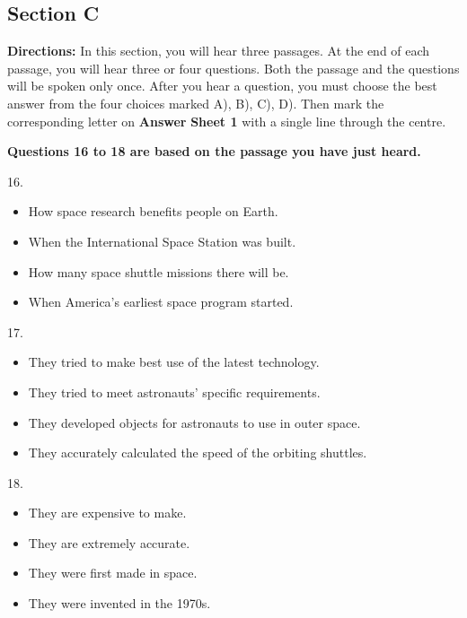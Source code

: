 \documentclass[UTF8,11pt]{ctexart}
\begin{document}
\subsection*{\textbf{Section C}}


\textbf{Directions:} In this section, you will hear three passages. At the end of each passage, you will hear three or four questions. Both the passage and the questions will be spoken only once. After you hear a question, you must choose the best answer from the four choices marked A), B), C), D). Then mark the corresponding letter on\textbf{ Answer} \textbf{Sheet 1} with a single line through the centre.


\textbf{Questions 16 to 18 are based on the passage you have just heard.}


16.


\begin{itemize}[leftmargin=2em,itemsep=.2em,topsep=.4em]\item[A.] How space research benefits people on Earth.
\item[B.] When the International Space Station was built.
\item[C.] How many space shuttle missions there will be.
\item[D.] When America's earliest space program started.
\end{itemize}

17.


\begin{itemize}[leftmargin=2em,itemsep=.2em,topsep=.4em]\item[A.] They tried to make best use of the latest technology.
\item[B.] They tried to meet astronauts' specific requirements.
\item[C.] They developed objects for astronauts to use in outer space.
\item[D.] They accurately calculated the speed of the orbiting shuttles.
\end{itemize}

18.


\begin{itemize}[leftmargin=2em,itemsep=.2em,topsep=.4em]\item[A.] They are expensive to make.
\item[B.] They are extremely accurate.
\item[C.] They were first made in space.
\item[D.] They were invented in the 1970s.
\end{itemize}
\end{document}
